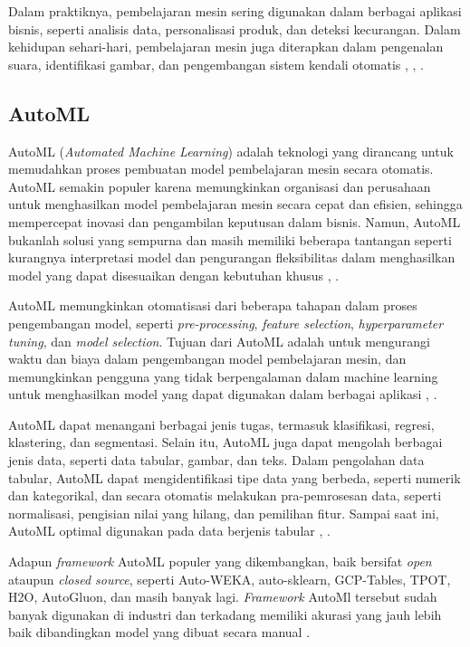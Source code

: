 Dalam praktiknya, pembelajaran mesin sering digunakan dalam berbagai aplikasi bisnis, seperti analisis data, personalisasi produk, dan deteksi kecurangan.
Dalam kehidupan sehari-hari, pembelajaran mesin juga diterapkan dalam pengenalan suara, identifikasi gambar, dan pengembangan sistem kendali otomatis \cite{jordan2015machine}, \cite{Alpaydin2014}, \cite{murphy2012machine}.

\subsection{AutoML}
AutoML (\emph{Automated Machine Learning}) adalah teknologi yang dirancang untuk memudahkan proses pembuatan model pembelajaran mesin secara otomatis. AutoML
semakin populer karena memungkinkan organisasi dan perusahaan untuk menghasilkan model pembelajaran mesin secara cepat dan efisien, sehingga mempercepat
inovasi dan pengambilan keputusan dalam bisnis. Namun, AutoML bukanlah solusi yang sempurna dan masih memiliki beberapa tantangan seperti kurangnya
interpretasi model dan pengurangan fleksibilitas dalam menghasilkan model yang dapat disesuaikan dengan kebutuhan khusus \cite{manashgoswami_2023},
\cite{singla_2020}.

AutoML memungkinkan otomatisasi dari beberapa tahapan dalam proses pengembangan model, seperti \emph{pre-processing}, \emph{feature selection},
\emph{hyperparameter tuning}, dan \emph{model selection}. Tujuan dari AutoML adalah untuk mengurangi waktu dan biaya dalam pengembangan model pembelajaran
mesin, dan memungkinkan pengguna yang tidak berpengalaman dalam machine learning untuk menghasilkan model yang dapat digunakan dalam berbagai aplikasi \cite{manashgoswami_2023}, \cite{singla_2020}.

AutoML dapat menangani berbagai jenis tugas, termasuk klasifikasi, regresi, klastering, dan segmentasi. Selain itu, AutoML juga dapat mengolah berbagai jenis
data, seperti data tabular, gambar, dan teks. Dalam pengolahan data tabular, AutoML dapat mengidentifikasi tipe data yang berbeda, seperti numerik dan
kategorikal, dan secara otomatis melakukan pra-pemrosesan data, seperti normalisasi, pengisian nilai yang hilang, dan pemilihan fitur. Sampai saat ini, AutoML
optimal digunakan pada data berjenis tabular \cite{manashgoswami_2023}, \cite{singla_2020}.

Adapun \emph{framework} AutoML populer yang dikembangkan, baik bersifat \emph{open} ataupun \emph{closed source}, seperti Auto-WEKA, auto-sklearn, GCP-Tables,
TPOT, H2O, AutoGluon, dan masih banyak lagi. \emph{Framework} AutoMl tersebut sudah banyak digunakan di industri dan terkadang memiliki akurasi yang jauh lebih
baik dibandingkan model yang dibuat secara manual \cite{agtabular}.

